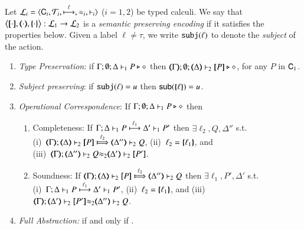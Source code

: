 \begin{definition}\rm
\label{def:ep}
	Let
	$\tyl{L}_i=\calc{\CAL_i}{{\cal{T}}_i}{\hby{\ell}}{\wb_i}{\proves_i}$
	($i=1,2$) be typed calculi. 
	We say that
	$\enco{\map{\cdot}, \mapt{\cdot}, \mapa{\cdot}}: \tyl{L}_1 \to \tyl{L}_2$
	is a \emph{semantic preserving encoding}
	if it satisfies the properties below.
	Given a label $\ell \neq \tau$, we write 
	$\subj{\ell}$
	to denote the \emph{subject} of the action.
	
	\begin{enumerate}[1.]
		\item	\emph{Type Preservation}:
			if
			$\Gamma; \emptyset; \Delta \proves_1 P \hastype \Proc$ then 
			$\mapt{\Gamma}; \emptyset; \mapt{\Delta} \proves_2 \map{P} \hastype \Proc$,  
			for any   $P$ in $\CAL_1$.
		\item	\emph{Subject preserving}: if $\subj{\ell} = u$ then $\mathsf{sub}(\mapa{\ell}) =u$.


		\item	\emph{Operational Correspondence}:
			If $\Gamma; \emptyset; \Delta \proves_1 P \hastype \Proc$ then
			\begin{enumerate}
				\item	Completeness: 
					If  
					$\stytraarg{\Gamma}{\ell_1}{\Delta}{P}{\Delta'}{P'}{1}$
					then $\exists \ell_2, Q, \Delta''$ s.t. \\
					(i)~$\wtytraarg{\mapt{\Gamma}}{\ell_2}{\mapt{\Delta}}{\map{P}}{\mapt{\Delta''}}{Q}{2}$,
					(ii)~$\ell_2 = \mapa{\ell_1}$, 
					and \\
					(iii)~${\mapt{\Gamma}};{\mapt{\Delta''}}\proves_2 {Q}{\wb_2}{\mapt{\Delta'}}\proves_2 {\map{P'}}$.
				
				\item	Soundness:   
					If  $\wtytraarg{\mapt{\Gamma}}{\ell_2}{\mapt{\Delta}}{\map{P}}{\mapt{\Delta''}}{Q}{2}$
					then $\exists \ell_1, P', \Delta'$ s.t.  \\
					(i)~$\stytraarg{\Gamma}{\ell_1}{\Delta}{P}{\Delta'}{P'}{1}$,
					(ii)~$\ell_2 = \mapa{\ell_1}$, and
					(iii)~
					${\mapt{\Gamma}};{\mapt{\Delta'}}\proves_2 {\map{P'}}{\wb_2}
					{\mapt{\Delta''}}\proves_2 {Q}$.
		\end{enumerate}
		
		\item	\emph{Full Abstraction:} 
			if and only if
			.
	\end{enumerate}
\end{definition}

